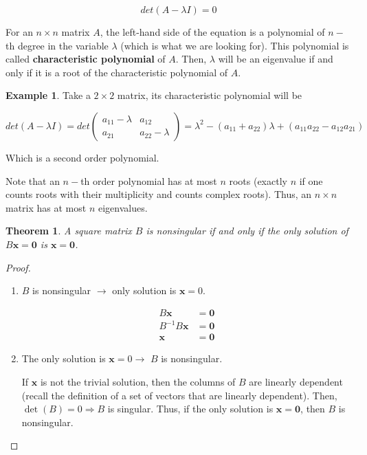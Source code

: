\documentclass[a4paper,11pt]{article}
\theoremstyle{definition}
\newtheorem{example}{Example}
\theoremstyle{plain}
\newtheorem{theorem}{Theorem}
\begin{document}
\[
det(A-\lambda I) = 0
\]

For an \(n\times n\) matrix \(A\), the left-hand side of the equation is
a polynomial of \(n-\)th degree in the variable \(\lambda\) (which is
what we are looking for). This polynomial is called
\textbf{characteristic polynomial} of \(A\). Then, \(\lambda\) will be
an eigenvalue if and only if it is a root of the characteristic
polynomial of \(A\).

\begin{example}
Take a \(2\times 2\) matrix, its characteristic
polynomial will be

\[
det(A-\lambda I)  = det\begin{pmatrix} a_{11}-\lambda & a_{12} \\ a_{21} & a_{22}-\lambda \end{pmatrix} = \lambda^2 - (a_{11}+a_{22})\lambda + (a_{11}a_{22}-a_{12}a_{21})
\]

Which is a second order polynomial.
\end{example}

Note that an \(n-\)th order polynomial has at most \(n\) roots (exactly
\(n\) if one counts roots with their multiplicity and counts complex
roots). Thus, an \(n\times n\) matrix has at most \(n\) eigenvalues.

\begin{theorem}
A square matrix \(B\) is nonsingular if and only if the
only solution of \(B\mathbf{x} = \mathbf{0}\) is
\(\mathbf{x} = \mathbf{0}\).
\end{theorem}

\begin{proof}

\begin{enumerate}
\def\labelenumi{\arabic{enumi}.}
\item
  \(B\) is nonsingular \(\rightarrow\) only solution is
  \(\mathbf{x} = 0\).

  \begin{align*}
  B\mathbf{x} &= \mathbf{0} \\
  B^{-1}B\mathbf{x} &= \mathbf{0} \\
  \mathbf{x} &= \mathbf{0}
  \end{align*}
\item
  The only solution is \(\mathbf{x} = 0 \rightarrow\) \(B\) is
  nonsingular.

  If \(\mathbf{x}\) is not the trivial solution, then the columns of \(B\) are linearly dependent (recall the definition of a set of vectors that are linearly dependent). Then, \(\det(B) = 0\Rightarrow B\) is singular. Thus, if the only solution is \(\mathbf{x} = \mathbf{0}\), then \(B\) is
nonsingular.
\end{enumerate}
\end{proof}
\end{document}
